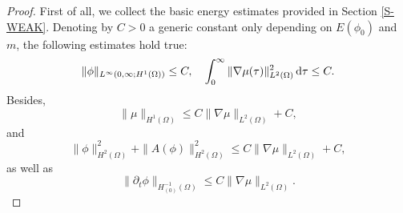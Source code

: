 \documentclass[11pt,reqno]{amsart}
\theoremstyle{remark}
\def\d{{\rm d}}
\numberwithin{equation}{section}
\def\d{{\rm d}}
\begin{document}
\begin{proof}
First of all, we collect the basic energy estimates provided in Section \ref{S-WEAK}. Denoting by $C>0$ a generic constant only depending on $E(\phi_0)$ and $m$, the following estimates hold true:
\begin{equation}
\| \phi\|_{L^\infty( 0,\infty; H^1(\Omega))} \leq C, \quad
\int_0^\infty \| \nabla \mu (\tau) \|_{L^2(\Omega)}^2 \, \d \tau \leq C.
\end{equation}
Besides,
\begin{equation}
\label{est-mu-H1-3D-d}
\| \mu\|_{H^1(\Omega)}\leq C \| \nabla \mu\|_{L^2(\Omega)} + C,
\end{equation}
and
\begin{equation}
\label{est-A-H2-3D-d}
\| \phi\|_{H^2(\Omega)}^2  + \| A(\phi)\|_{H^2(\Omega)}^2 \leq C \| \nabla \mu\|_{L^2(\Omega)} + C,
\end{equation}
as well as
\begin{equation}
\label{est-phit-H-1-3D-d}
\| \partial_t \phi\|_{ H^{-1}_{(0)}(\Omega)} \leq C \| \nabla \mu\|_{L^2(\Omega)}.
\end{equation}


\end{proof}
\end{document}
